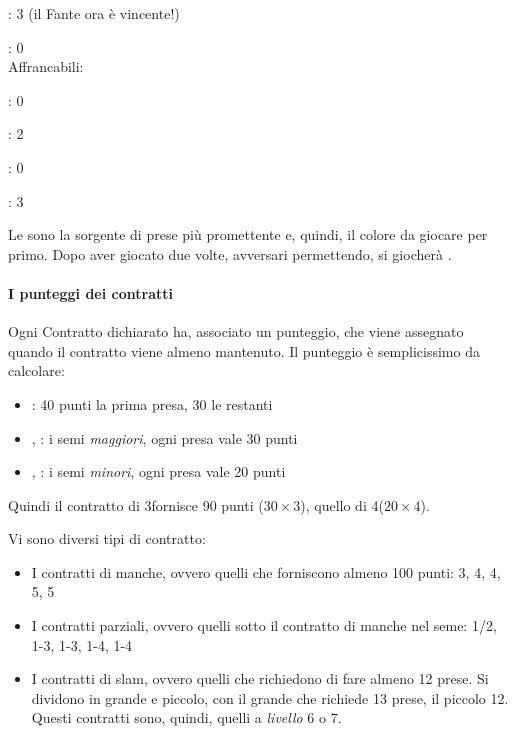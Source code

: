 \documentclass[../corsofiori.tex]{subfiles}
\begin{document}
\Di: 3 (il Fante ora è vincente!)

\Cl: 0\\
\noindent Affrancabili:

\Sp: 0

\He: 2

\Di: 0

\Cl: 3

Le \fio sono la sorgente di prese più promettente e, quindi, il colore da giocare per primo. Dopo aver giocato
\fio
due volte, avversari permettendo, si giocherà \cu.
\newgame


\paragraph{I punteggi dei contratti}

Ogni Contratto dichiarato ha, associato un punteggio, che viene assegnato quando il contratto viene almeno mantenuto. Il
punteggio è semplicissimo da calcolare:

\begin{itemize}
    \item \SA: 40 punti la prima presa, 30 le restanti
    \item \Sp, \He: i semi \emph{maggiori}, ogni presa vale 30 punti
    \item \Di, \Cl: i semi \emph{minori}, ogni presa vale 20 punti
\end{itemize}

Quindi il contratto di 3\He fornisce 90 punti ($30 \times 3$), quello di 4\Cl ($20 \times 4$).

Vi sono diversi tipi di contratto:

\begin{itemize}
    \item I contratti di manche, ovvero quelli che forniscono almeno 100 punti: 3\SA, 4\Sp, 4\He, 5\Di, 5\Cl
    \item I contratti parziali, ovvero quelli sotto il contratto di manche nel seme: 1/2\SA, 1-3\Sp, 1-3\He, 1-4\Di,
        1-4\Cl
    \item I contratti di slam, ovvero quelli che richiedono di fare almeno 12 prese. Si dividono in grande e piccolo,
        con il grande che richiede 13 prese, il piccolo 12. Questi contratti sono, quindi, quelli a
        \emph{livello} 6 o
        7.
\end{itemize}
\end{document}
